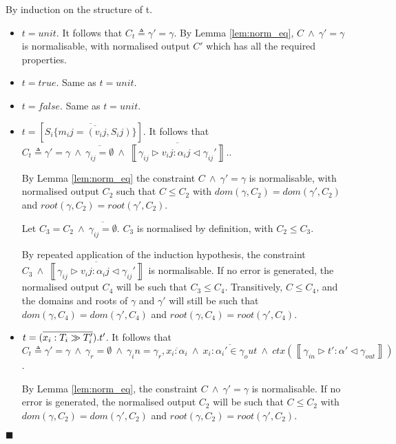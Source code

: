 \documentclass[preprint]{sigplanconf}
\newcommand{\lemref}[1]{Lemma \ref{#1}}
\newcommand{\inferrule}[4]{\left\llbracket #1 \triangleright #2 : #3 \triangleleft #4 \right\rrbracket}
\newcommand{\cand}{\:\wedge\:}
\newcommand{\qed}{$\blacksquare$}
\newenvironment{proof}{\vspace{1ex}\noindent{\bf Proof}\hspace{0.5em}}
  {\hfill\qed\vspace{1ex}}
\begin{document}
\begin{proof}
By induction on the structure of t.

\begin{itemize}
\item $t = unit$. It follows that 
$C_t \triangleq \gamma' = \gamma$. 
By \lemref{lem:norm_eq}, $C \cand \gamma' = \gamma$ is normalisable, with
normalised output $C'$ which has all the required properties.

\item $t = true$. Same as $t = unit$.

\item $t = false$. Same as $t = unit$. 

\item $t = \left[ \overline{ S_i \{ \overline{m_ij = (v_ij, S_ij)} \} }  \right]$.
It follows that 
$C_t \triangleq 
\gamma' = \gamma \cand
\overline{\gamma_{ij} = \emptyset} \cand
\overline{\inferrule{\gamma_{ij}}{v_ij}{\alpha_ij}{\gamma_{ij}'}}.
$.

By \lemref{lem:norm_eq} the constraint $C \cand \gamma' = \gamma$ is
normalisable, with normalised output $C_2$ such that $C \leq C_2$ with
$dom(\gamma, C_2) = dom(\gamma', C_2)$ and $root(\gamma, C_2) = root(\gamma', C_2)$.

Let $C_3 = C_2 \cand \overline{\gamma_{ij} = \emptyset}$. 
$C_3$ is normalised by definition, with $C_2 \leq C_3$.

By repeated application of the induction hypothesis, the constraint
$C_3 \cand \overline{\inferrule{\gamma_{ij}}{v_ij}{\alpha_ij}{\gamma_{ij}'}}$
is normalisable. If no error is generated, the normalised output $C_4$ will be such that $C_3 \leq C_4$. Transitively, $C \leq C_4$, and the domains and roots
of $\gamma$ and $\gamma'$ will still be such that $dom(\gamma, C_4) = dom(\gamma', C_4)$ and $root(\gamma, C_4) = root(\gamma', C_4)$.

\item $t = \\(\overline{x_i : T_i \gg T_i'}).t'$. 
It follows that 
$C_t \triangleq 
\gamma' = \gamma \cand \gamma_r = \emptyset \cand 
\gamma_in = \gamma_r, \overline{x_i : \alpha_i} \cand
\overline{x_i : \alpha_i' \in \gamma_out} \cand ctx(\inferrule{\gamma_{in}}{t'}{\alpha'}{\gamma_{out}})$.

By \lemref{lem:norm_eq}, the constraint $C \cand \gamma' = \gamma$
is normalisable. If no error is generated, the normalised output $C_2$ will be such that $C \leq C_2$ with $dom(\gamma, C_2) = dom(\gamma', C_2)$ and
$root(\gamma, C_2) = root(\gamma', C_2)$.


\end{itemize}
\end{proof}
\end{document}
